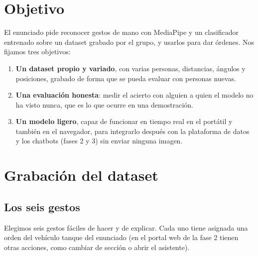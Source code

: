 \documentclass[11pt,a4paper]{article}
\begin{document}
\tableofcontents
\newpage

\section{Objetivo}

El enunciado pide reconocer gestos de mano con MediaPipe y un clasificador entrenado sobre un dataset grabado por el
grupo, y usarlos para dar órdenes. Nos fijamos tres objetivos:

\begin{enumerate}
  \item \textbf{Un dataset propio y variado}, con varias personas, distancias, ángulos y posiciones, grabado de forma
        que se pueda evaluar con personas nuevas.
  \item \textbf{Una evaluación honesta}: medir el acierto con alguien a quien el modelo no ha visto nunca, que es lo que
        ocurre en una demostración.
  \item \textbf{Un modelo ligero}, capaz de funcionar en tiempo real en el portátil y también en el navegador, para
        integrarlo después con la plataforma de datos y los chatbots (fases 2 y 3) sin enviar ninguna imagen.
\end{enumerate}

\section{Grabación del dataset}

\subsection{Los seis gestos}

Elegimos seis gestos fáciles de hacer y de explicar. Cada uno tiene asignada una orden del vehículo tanque del
enunciado (en el portal web de la fase 2 tienen otras acciones, como cambiar de sección o abrir el asistente).
\end{document}
